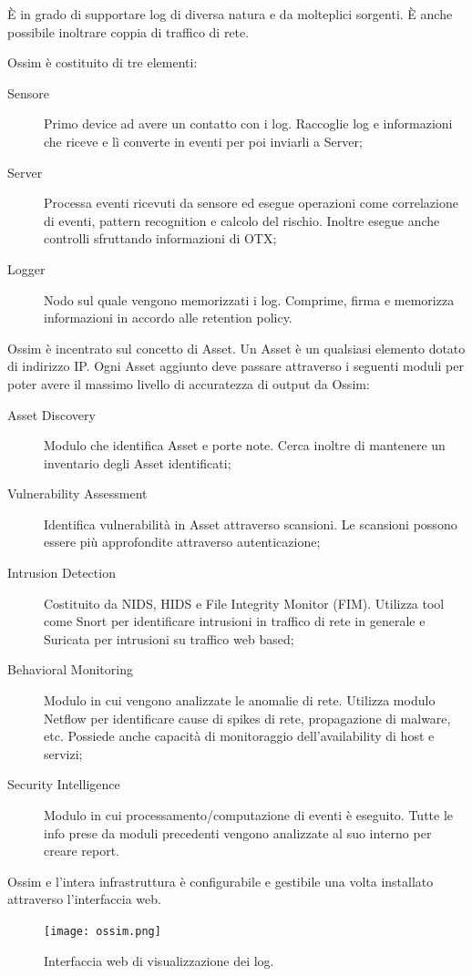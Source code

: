 È in grado di supportare log di diversa natura e da molteplici sorgenti. È anche possibile inoltrare coppia di traffico di rete.

Ossim è costituito di tre elementi:
\begin{description}
    \item [Sensore] Primo device ad avere un contatto con i log. Raccoglie log e informazioni che riceve e lì converte in eventi per poi inviarli a Server;
    \item [Server] Processa eventi ricevuti da sensore ed esegue operazioni come correlazione di eventi, pattern recognition e calcolo del rischio. Inoltre esegue anche controlli sfruttando informazioni di OTX;
    \item [Logger] Nodo sul quale vengono memorizzati i log. Comprime, firma e memorizza informazioni in accordo alle retention policy.
\end{description}

Ossim è incentrato sul concetto di Asset. Un Asset è un qualsiasi elemento dotato di indirizzo IP.
Ogni Asset aggiunto deve passare attraverso i seguenti moduli per poter avere il massimo livello di accuratezza di output da Ossim:
\begin{description}
    \item [Asset Discovery] Modulo che identifica Asset e porte note. Cerca inoltre di mantenere un inventario degli Asset identificati;
    \item [Vulnerability Assessment] Identifica vulnerabilità in Asset attraverso scansioni. Le scansioni possono essere più approfondite attraverso autenticazione;
    \item [Intrusion Detection] Costituito da NIDS, HIDS e File Integrity Monitor (FIM). Utilizza tool come Snort per identificare intrusioni in  traffico di rete in generale e Suricata per intrusioni su traffico web based;
    \item [Behavioral Monitoring] Modulo in cui vengono analizzate le anomalie di rete. Utilizza modulo Netflow per identificare cause di spikes di rete, propagazione di malware, etc.
    Possiede anche capacità di monitoraggio dell'availability di host e servizi;
    \item [Security Intelligence] Modulo in cui processamento/computazione di eventi è eseguito. Tutte le info prese da moduli precedenti vengono analizzate al suo interno per creare report. 
\end{description}

Ossim e l'intera infrastruttura è configurabile e gestibile una volta installato attraverso l'interfaccia web.
\begin{figure}[hbtp]
    \centering
    \texttt{[image: ossim.png]}
    \caption{Interfaccia web di visualizzazione dei log.}
    \label{fig:ossim}
\end{figure}

